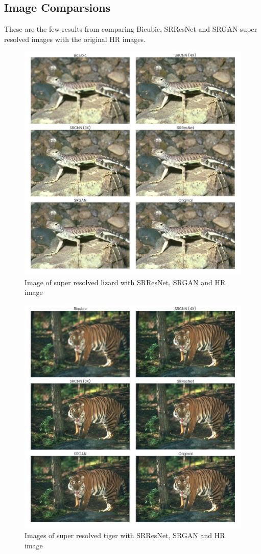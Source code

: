 \subsection{Image Comparsions}
    These are the few results from comparing Bicubic, SRResNet and SRGAN super resolved images with the original HR images.
    \begin{figure}
        \centering
        \includegraphics[width=5.5in]{./figures/examples/lizard.jpg}
        \caption{Image of super resolved lizard with SRResNet, SRGAN and HR image}
    \end{figure}
    \begin{figure}
        \centering
        \includegraphics[width=5.5in]{./figures/examples/tiger.jpg}
        \caption{Images of super resolved tiger with SRResNet, SRGAN and HR image}
    \end{figure}
